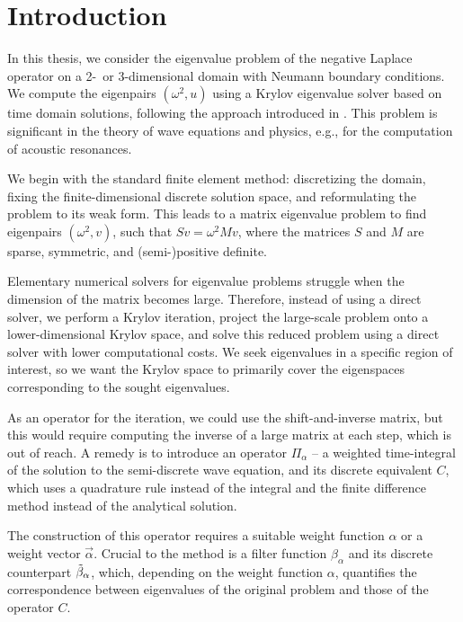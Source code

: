 \documentclass[a4paper,11pt,bibliography=totoc,listof=totoc,headinclude=true,cleardoublepage=empty,oneside]{scrbook}
\newcommand{\dff}{\Tilde{\beta}_\alpha}
\begin{document}
\chapter{Introduction}
\label{chapter:introduction}
In this thesis, we consider the eigenvalue problem of the negative Laplace operator on a 2-~or 3-dimensional domain with Neumann boundary conditions. We compute the eigenpairs $(\omega^2, u)$ using a Krylov eigenvalue solver based on time domain solutions, following the approach introduced in \cite{nannen}. This problem is significant in the theory of wave equations and physics, e.g., for the computation of acoustic resonances.

We begin with the standard finite element method: discretizing the domain, fixing the finite-dimensional discrete solution space, and reformulating the problem to its weak form. This leads to a matrix eigenvalue problem to find eigenpairs $(\omega^2, v)$, such that $Sv = \omega^2Mv$, where the matrices $S$ and $M$ are sparse, symmetric, and (semi-)positive definite. 

Elementary numerical solvers for eigenvalue problems struggle when the dimension of the matrix becomes large. Therefore, instead of using a direct solver, we perform a Krylov iteration, project the large-scale problem onto a lower-dimensional Krylov space, and solve this reduced problem using a direct solver with lower computational costs. We seek eigenvalues in a specific region of interest, so we want the Krylov space to primarily cover the eigenspaces corresponding to the sought eigenvalues. 

As an operator for the iteration, we could use the shift-and-inverse matrix, but this would require computing the inverse of a large matrix at each step, which is out of reach. A remedy is to introduce an operator $\Pi_\alpha$ -- a weighted time-integral of the solution to the semi-discrete wave equation, and its discrete equivalent $C$, which uses a quadrature rule instead of the integral and the finite difference method instead of the analytical solution. 

The construction of this operator requires a suitable weight function $\alpha$ or a weight vector $\vec{\alpha}$. Crucial to the method is a filter function $\beta_\alpha$ and its discrete counterpart $\dff$, which, depending on the weight function $\alpha$, quantifies the correspondence between eigenvalues of the original problem and those of the operator $C$. 
\end{document}
